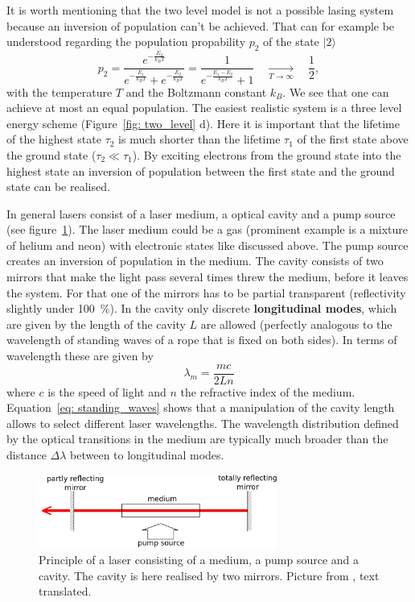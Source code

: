 It is worth mentioning that the two level model is not a possible lasing system because an inversion of population
can't be achieved. That can for example be understood
regarding the population propability $p_2$ of the state $|2\rangle$
\begin{equation}
  p_2 = \frac{e^{-\frac{E_2}{k_B T}}}{ e^{-\frac{E_1}{k_B T}} + e^{-\frac{E_2}{k_B T}} } =
  \frac{1}{ e^{-\frac{E_1 - E_2}{k_B T}} + 1}
    \quad \underset{T \rightarrow \infty}{\longrightarrow}\quad  \frac{1}{2},
\end{equation}
with the temperature $T$ and the Boltzmann constant $k_B$. We see that one can achieve at most an equal population. The easiest
realistic system is a three level energy scheme (Figure~\ref{fig: two_level} d). Here it is important that the lifetime of the highest state $\tau_2$ is much shorter
than the lifetime $\tau_1$ of the first state above the ground state ($\tau_2 \ll \tau_1$). By exciting electrons from the ground state into the highest
state an inversion of population between the first state and the ground state can be realised.

In general lasers consist of a laser medium, a optical cavity and a pump source (see figure~\ref{fig: principle_laser}).
The laser medium could be a gas (prominent example is a mixture of helium and neon) with electronic states like discussed above. The pump source
creates an inversion of population in the medium. The cavity consists of two mirrors that make the light pass several times threw the medium, before
it leaves the system. For that one of the mirrors has to be partial transparent (reflectivity slightly under \SI{100}{\percent}). In the
cavity only discrete \textbf{longitudinal modes}, which are given by the length of the cavity $L$ are allowed (perfectly analogous 
to the wavelength of standing waves of a rope that is fixed on both sides). In terms of wavelength these are
given by
\begin{equation}
  \lambda_m = \frac{m c}{2 L n}
  \label{eq: standing_waves}
\end{equation}
where $c$ is the speed of light and $n$ the refractive index of the medium. Equation~\eqref{eq: standing_waves} shows that a manipulation of the
cavity length allows to select different laser wavelengths. The wavelength distribution defined by the optical transitions in the medium 
are typically much broader than the distance $\Delta \lambda$ between to longitudinal modes. 

\begin{figure}
  \centering
  \includegraphics[width = 0.7\textwidth]{pics/prinzip_laser.png}
  \caption{Principle of a laser consisting of a medium, a pump source and a cavity. The cavity is here realised by two mirrors.
  Picture from \cite{anleitung61}, text translated.}
  \label{fig: principle_laser}
\end{figure}

